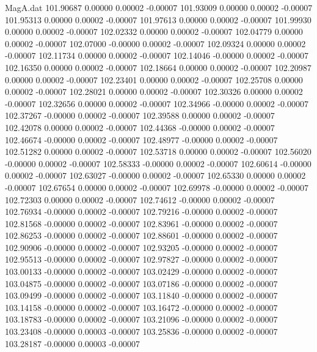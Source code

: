 \begin{filecontents}{MagA.dat}
 101.90687    0.00000    0.00002   -0.00007
 101.93009    0.00000    0.00002   -0.00007
 101.95313    0.00000    0.00002   -0.00007
 101.97613    0.00000    0.00002   -0.00007
 101.99930    0.00000    0.00002   -0.00007
 102.02332    0.00000    0.00002   -0.00007
 102.04779    0.00000    0.00002   -0.00007
 102.07000   -0.00000    0.00002   -0.00007
 102.09324    0.00000    0.00002   -0.00007
 102.11734    0.00000    0.00002   -0.00007
 102.14046   -0.00000    0.00002   -0.00007
 102.16350    0.00000    0.00002   -0.00007
 102.18664    0.00000    0.00002   -0.00007
 102.20987    0.00000    0.00002   -0.00007
 102.23401    0.00000    0.00002   -0.00007
 102.25708    0.00000    0.00002   -0.00007
 102.28021    0.00000    0.00002   -0.00007
 102.30326    0.00000    0.00002   -0.00007
 102.32656    0.00000    0.00002   -0.00007
 102.34966   -0.00000    0.00002   -0.00007
 102.37267   -0.00000    0.00002   -0.00007
 102.39588    0.00000    0.00002   -0.00007
 102.42078    0.00000    0.00002   -0.00007
 102.44368   -0.00000    0.00002   -0.00007
 102.46674   -0.00000    0.00002   -0.00007
 102.48977   -0.00000    0.00002   -0.00007
 102.51282    0.00000    0.00002   -0.00007
 102.53718    0.00000    0.00002   -0.00007
 102.56020   -0.00000    0.00002   -0.00007
 102.58333   -0.00000    0.00002   -0.00007
 102.60614   -0.00000    0.00002   -0.00007
 102.63027   -0.00000    0.00002   -0.00007
 102.65330    0.00000    0.00002   -0.00007
 102.67654    0.00000    0.00002   -0.00007
 102.69978   -0.00000    0.00002   -0.00007
 102.72303    0.00000    0.00002   -0.00007
 102.74612   -0.00000    0.00002   -0.00007
 102.76934   -0.00000    0.00002   -0.00007
 102.79216   -0.00000    0.00002   -0.00007
 102.81568   -0.00000    0.00002   -0.00007
 102.83961   -0.00000    0.00002   -0.00007
 102.86253   -0.00000    0.00002   -0.00007
 102.88601   -0.00000    0.00002   -0.00007
 102.90906   -0.00000    0.00002   -0.00007
 102.93205   -0.00000    0.00002   -0.00007
 102.95513   -0.00000    0.00002   -0.00007
 102.97827   -0.00000    0.00002   -0.00007
 103.00133   -0.00000    0.00002   -0.00007
 103.02429   -0.00000    0.00002   -0.00007
 103.04875   -0.00000    0.00002   -0.00007
 103.07186   -0.00000    0.00002   -0.00007
 103.09499   -0.00000    0.00002   -0.00007
 103.11840   -0.00000    0.00002   -0.00007
 103.14158   -0.00000    0.00002   -0.00007
 103.16472   -0.00000    0.00002   -0.00007
 103.18783   -0.00000    0.00002   -0.00007
 103.21096   -0.00000    0.00002   -0.00007
 103.23408   -0.00000    0.00003   -0.00007
 103.25836   -0.00000    0.00002   -0.00007
 103.28187   -0.00000    0.00003   -0.00007

\end{filecontents}
